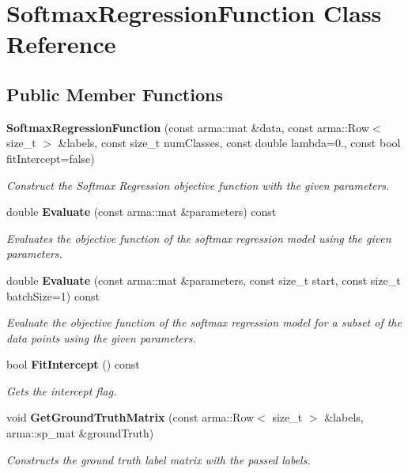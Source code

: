 \section{Softmax\+Regression\+Function Class Reference}
\label{classmlpack_1_1regression_1_1SoftmaxRegressionFunction}
\subsection*{Public Member Functions}
\begin{DoxyCompactItemize}
\item 
\textbf{ Softmax\+Regression\+Function} (const arma\+::mat \&data, const arma\+::\+Row$<$ size\+\_\+t $>$ \&labels, const size\+\_\+t num\+Classes, const double lambda=0., const bool fit\+Intercept=false)
\begin{DoxyCompactList}\small\item\em Construct the Softmax Regression objective function with the given parameters. \end{DoxyCompactList}\item 
double \textbf{ Evaluate} (const arma\+::mat \&parameters) const
\begin{DoxyCompactList}\small\item\em Evaluates the objective function of the softmax regression model using the given parameters. \end{DoxyCompactList}\item 
double \textbf{ Evaluate} (const arma\+::mat \&parameters, const size\+\_\+t start, const size\+\_\+t batch\+Size=1) const
\begin{DoxyCompactList}\small\item\em Evaluate the objective function of the softmax regression model for a subset of the data points using the given parameters. \end{DoxyCompactList}\item 
bool \textbf{ Fit\+Intercept} () const
\begin{DoxyCompactList}\small\item\em Gets the intercept flag. \end{DoxyCompactList}\item 
void \textbf{ Get\+Ground\+Truth\+Matrix} (const arma\+::\+Row$<$ size\+\_\+t $>$ \&labels, arma\+::sp\+\_\+mat \&ground\+Truth)
\begin{DoxyCompactList}\small\item\em Constructs the ground truth label matrix with the passed labels. \end{DoxyCompactList}\item 

\end{DoxyCompactItemize}
